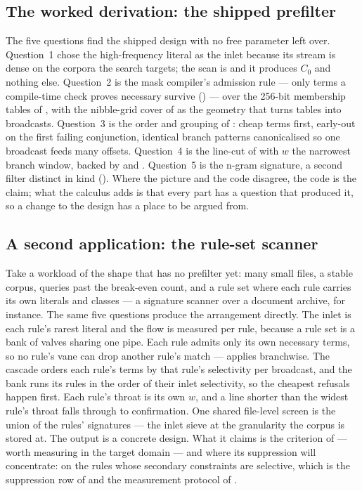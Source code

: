 \documentclass[11pt,letterpaper]{article}
\begin{document}
\subsection{The worked derivation: the shipped prefilter}
\label{sec:calculus:worked}
The five questions find the shipped design with no free parameter left
over. Question~1 chose the high-frequency literal as the inlet because
its stream is dense on the corpora the search targets; the scan is
 and it produces $C_0$ and nothing
else. Question~2 is the mask compiler's admission rule --- only terms a
compile-time check proves necessary survive ()
--- over the 256-bit membership tables of
, with the nibble-grid cover of
 as the geometry that turns tables into
broadcasts. Question~3 is the order and grouping of :
cheap terms first, early-out on the first failing conjunction, identical
branch patterns canonicalised so one broadcast feeds many offsets.
Question~4 is the line-cut of  with $w$ the
narrowest branch window, backed by  and
. Question~5 is the n-gram signature, a second filter
distinct in kind (). Where the picture and the code
disagree, the code is the claim; what the calculus adds is that every
part has a question that produced it, so a change to the design has a
place to be argued from.

\subsection{A second application: the rule-set scanner}
\label{sec:calculus:second}
Take a workload of the  shape that has no prefilter yet:
many small files, a stable corpus, queries past the break-even count, and
a rule set where each rule carries its own literals and classes --- a
signature scanner over a document archive, for instance. The same five
questions produce the arrangement directly. The inlet is each rule's
rarest literal and the flow is measured per rule, because a rule set is a
bank of valves sharing one pipe. Each rule admits only its own necessary
terms, so no rule's vane can drop another rule's match ---
 applies branchwise. The cascade orders each rule's terms
by that rule's selectivity per broadcast, and the bank runs its rules in
the order of their inlet selectivity, so the cheapest refusals happen
first. Each rule's throat is its own $w$, and a line shorter than the
widest rule's throat falls through to confirmation. One shared
file-level screen is the union of the rules' signatures --- the inlet
sieve at the granularity the corpus is stored at. The output is a
concrete design. What it claims is the criterion of  ---
worth measuring in the target domain --- and where its suppression will
concentrate: on the rules whose secondary constraints are selective,
which is the suppression row of  and the measurement
protocol of .
\end{document}
